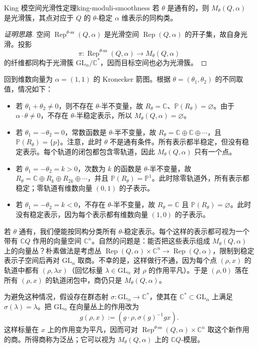 \begin{theorem}{King 模空间光滑性定理}{king-moduli-smoothness}
若 $\theta$ 是通有的，则 $M_\theta(Q,\alpha)$ 是光滑簇，其点对应于 $Q$ 的 $\theta$-稳定 $\alpha$ 维表示的同构类。
\end{theorem}
\begin{proof}[证明思路]
空间 $\operatorname{Rep}^{\theta\text{-ss}}(Q,\alpha)$ 是光滑空间 $\operatorname{Rep}(Q,\alpha)$ 的开子集，故自身光滑。投影
\[
  \pi\colon\operatorname{Rep}^{\theta\text{-ss}}(Q,\alpha)
  \longrightarrow M_\theta(Q,\alpha)
\]
的纤维都同构于光滑簇 $\mathrm{GL}_\alpha/\mathbb C^*$，因而目标空间也必为光滑簇。
\end{proof}

\begin{example}
回到维数向量为 $\alpha=(1,1)$ 的 Kronecker 箭图。根据 $\theta=(\theta_1,\theta_2)$ 的不同取值，情况如下：
\begin{itemize}
  \item 若 $\theta_1+\theta_2\ne0$，则不存在 $\theta$-半不变量，故 $R_\theta=\mathbb C$、$\mathbb P(R_\theta)=\varnothing$。由于 $\alpha\cdot\theta\ne0$，不存在 $\theta$-半稳定表示，所以 $M_\theta(Q,\alpha)=\varnothing$。
  \item 若 $\theta_1=-\theta_2=0$，常数函数是 $\theta$-半不变量，故 $R_\theta=\mathbb C\oplus\mathbb C\oplus\cdots$，且 $\mathbb P(R_\theta)=\{p\}$。注意，此时 $\theta$ 不是通有条件。所有表示都半稳定，但没有稳定表示。每个轨道的闭包都包含零轨道，因此 $M_\theta(Q,\alpha)$ 只有一个点。
  \item 若 $\theta_1=-\theta_2=k>0$，次数为 $k$ 的函数是 $\theta$-半不变量，故
  $R_\theta=\mathbb C\oplus R_k\oplus R_{2k}\oplus\cdots$，并且 $\mathbb P(R_\theta)=\mathbb P^1$。此时除零轨道外，所有表示都稳定；零轨道有维数向量 $(0,1)$ 的子表示。
  \item 若 $\theta_1=-\theta_2=k<0$，不存在 $\theta$-半不变量，故 $R_\theta=\mathbb C$ 且 $\mathbb P(R_\theta)=\varnothing$。此时没有稳定表示，因为每个表示都有维数向量 $(1,0)$ 的子表示。
\end{itemize}

若 $\theta$ 通有，我们便能按同构分类所有 $\theta$-稳定表示。每个这样的表示都可视为一个带有 $\mathbb C Q$ 作用的向量空间 $\mathbb C^n$。自然的问题是：能否把这些表示组成 $M_\theta(Q,\alpha)$ 上的向量丛？朴素做法是考虑丛 $\operatorname{Rep}(Q,\alpha)\times\mathbb C^n\to\operatorname{Rep}(Q,\alpha)$，限制到稳定表示子空间后再对 $\mathrm{GL}_\alpha$ 取商。不幸的是，这样做行不通，因为每个点 $(\rho,x)$ 的轨道中都有 $(\rho,\lambda x)$（回忆标量 $\lambda\in\mathrm{GL}_\alpha$ 对 $\rho$ 的作用平凡）。于是 $(\rho,0)$ 落在所有 $(\rho,x)$ 的轨道闭包中，商仍只是 $M_\theta(Q,\alpha)$。

为避免这种情况，假设存在群态射 $\sigma\colon\mathrm{GL}_\alpha\to\mathbb C^*$，使其在 $\mathbb C^*\subset\mathrm{GL}_\alpha$ 上满足 $\sigma(\lambda)=\lambda$。把 $\mathrm{GL}_\alpha$ 在向量丛上的作用改为
\[
  g(\rho,x):=(g\cdot\rho,\sigma(g)^{-1}gx).
\]
这样标量在 $x$ 上的作用变为平凡，因而可对 $\operatorname{Rep}^{\theta\text{-ss}}(Q,\alpha)\times\mathbb C^n$ 取这个新作用的商。所得商称为泛丛；它可以视为 $M_\theta(Q,\alpha)$ 上的 $\mathbb C Q$-模层。
\end{example}

